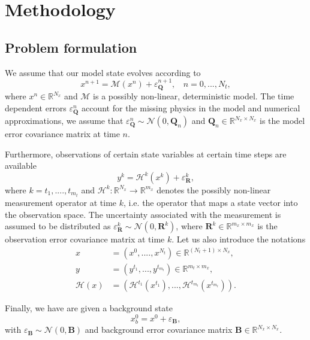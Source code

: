 \documentclass[a4paper,10pt]{article}
\numberwithin{equation}{section}
\begin{document}
\section{Methodology}
\subsection{Problem formulation}
We assume that our model state evolves according to 
\begin{equation}\label{eqn:strongmodel}x^{n+1}=\mathcal M(x^n)+\varepsilon_{\mathbf Q}^{n+1},\ \ \ \ n=0,...,N_t,
\end{equation}
where $x^n\in\mathbb R^{N_x}$ and $\mathcal M$ is a possibly non-linear, deterministic model. The time dependent errors $\varepsilon_{\mathbf Q}^n$ account for the missing physics in the model and numerical approximations, we assume that $\varepsilon_{\mathbf Q}^n \sim \mathcal N(0,\mathbf Q_n)$ and $\mathbf Q_n\in \mathbb R^{N_x\times N_x}$ is the model error covariance matrix at time $n$.

Furthermore, observations of certain state variables at certain time steps are available
\begin{equation}
y^k=\mathcal H^k(x^k)+\varepsilon_\mathbf R^k,
\end{equation}
where $k=t_1,....,t_{m_t}$ and $\mathcal H^k: \mathbb R^{N_x}\to\mathbb R^{m_x}$ denotes the possibly non-linear measurement operator at time $k$, i.e. the operator that maps a state vector into the observation space. The uncertainty associated with the measurement is assumed to be distributed as $\varepsilon_{\mathbf R}^k\sim \mathcal N(0,\mathbf R^k)$, where $\mathbf R^k\in \mathbb R^{m_x\times m_x}$ is the observation error covariance matrix at time $k$. 
Let us also introduce the notations
\begin{align*}
x&=(x^0,....,x^{N_t}) \in \mathbb R^{(N_t+1)\times N_x},\\
 y&=(y^{t_1},...,y^{t_{m_t}})\in \mathbb R^{m_t\times m_x},\\
\mathcal H(x)&=(\mathcal H^{t_1}(x^{t_1}),...,\mathcal H^{t_{m_t}}(x^{t_{m_t}})).
\end{align*}

Finally, we have are given a background state 
\begin{equation}x_b^0=x^0+\varepsilon_{\mathbf B},\end{equation}
with $\varepsilon_\mathbf B \sim \mathcal N(0,\mathbf B)$ and background error covariance matrix $\mathbf B\in \mathbb R^{N_x\times N_x}$.  
\end{document}
